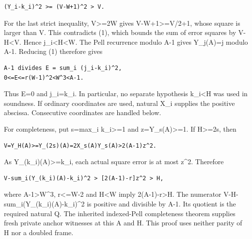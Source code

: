 \begin{verbatim}
(Y_i-k_i)^2 >= (V-W+1)^2 > V.
\end{verbatim}

For the last strict inequality, V\textgreater{}\allowbreak{}=\allowbreak{}2W gives V-W+\allowbreak{}1\textgreater{}\allowbreak{}=\allowbreak{}V/\allowbreak{}2+\allowbreak{}1, whose square is larger than V. This contradicts (1), which bounds the sum of error squares by V-H\textless{}\allowbreak{}V. Hence j\_\allowbreak{}i\textless{}\allowbreak{}H\textless{}\allowbreak{}W. The Pell recurrence modulo A-1 gives Y\_\allowbreak{}j(A)=\allowbreak{}j modulo A-1. Reducing (1) therefore gives



\begin{verbatim}
A-1 divides E = sum_i (j_i-k_i)^2,
0<=E<=r(W-1)^2<W^3<A-1.
\end{verbatim}

Thus E=\allowbreak{}0 and j\_\allowbreak{}i=\allowbreak{}k\_\allowbreak{}i. In particular, no separate hypothesis k\_\allowbreak{}i\textless{}\allowbreak{}H was used in soundness. If ordinary coordinates are used, natural X\_\allowbreak{}i supplies the positive abscissa. Consecutive coordinates are handled below.



For completeness, put s=\allowbreak{}max\_\allowbreak{}i k\_\allowbreak{}i\textgreater{}\allowbreak{}=\allowbreak{}1 and z=\allowbreak{}Y\_\allowbreak{}s(A)\textgreater{}\allowbreak{}=\allowbreak{}1. If H\textgreater{}\allowbreak{}=\allowbreak{}2s, then



\begin{verbatim}
V=Y_H(A)>=Y_(2s)(A)=2X_s(A)Y_s(A)>2(A-1)z^2.
\end{verbatim}

As Y\_\allowbreak{}(k\_\allowbreak{}i)(A)\textgreater{}\allowbreak{}=\allowbreak{}k\_\allowbreak{}i, each actual square error is at most z\textasciicircum{}\allowbreak{}2. Therefore



\begin{verbatim}
V-sum_i(Y_(k_i)(A)-k_i)^2 > [2(A-1)-r]z^2 > H,
\end{verbatim}

where A-1\textgreater{}\allowbreak{}W\textasciicircum{}\allowbreak{}3, r\textless{}\allowbreak{}=\allowbreak{}W-2 and H\textless{}\allowbreak{}W imply 2(A-1)-r\textgreater{}\allowbreak{}H. The numerator V-H-sum\_\allowbreak{}i(Y\_\allowbreak{}(k\_\allowbreak{}i)(A)-k\_\allowbreak{}i)\textasciicircum{}\allowbreak{}2 is positive and divisible by A-1. Its quotient is the required natural Q. The inherited indexed-Pell completeness theorem supplies fresh private anchor witnesses at this A and H. This proof uses neither parity of H nor a doubled frame.



